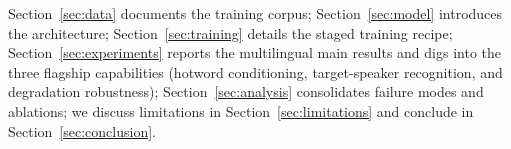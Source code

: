 Section~\ref{sec:data}
documents the training corpus; Section~\ref{sec:model} introduces the
architecture; Section~\ref{sec:training} details the staged training
recipe; Section~\ref{sec:experiments} reports the multilingual main
results and digs into the three flagship capabilities (hotword
conditioning, target-speaker recognition, and degradation robustness);
Section~\ref{sec:analysis} consolidates failure modes and ablations;
we discuss limitations in Section~\ref{sec:limitations} and conclude
in Section~\ref{sec:conclusion}.
